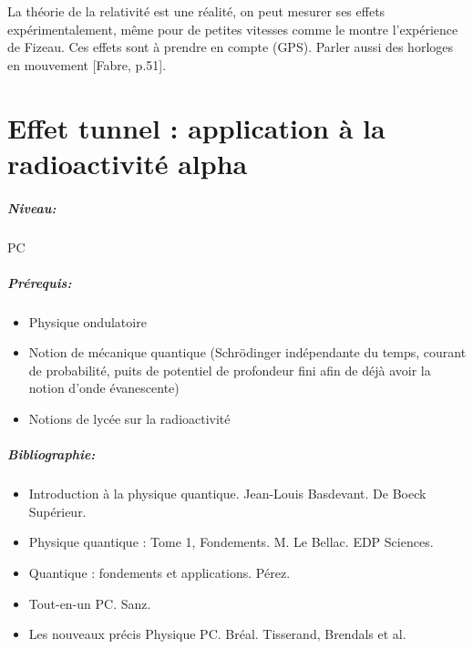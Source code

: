 \documentclass[11pt]{report}
\numberwithin{figure}{section}
\numberwithin{equation}{section}
\numberwithin{table}{section}
\newcommand{\1}{\boldsymbol{1}}
\begin{document}
La théorie de la relativité est une réalité, on peut mesurer ses effets expérimentalement, même pour de petites vitesses comme le montre l’expérience de Fizeau. Ces effets sont à prendre en compte (GPS). Parler aussi des horloges en mouvement [Fabre, p.51].

\newpage







\chapter{Effet tunnel : application à la radioactivité alpha}


\paragraph*{Niveau:} PC
\paragraph*{Prérequis:} 
\begin{itemize}
\item Physique ondulatoire
\item Notion de mécanique quantique (Schrödinger indépendante
du temps, courant de probabilité, puits
de potentiel de profondeur fini afin de déjà avoir la
notion d’onde évanescente)
\item Notions de lycée sur la radioactivité
\end{itemize}

\paragraph*{Bibliographie:}
\begin{itemize}
\item Introduction à la physique quantique. Jean-Louis Basdevant. De Boeck Supérieur.
\item Physique quantique : Tome 1, Fondements. M. Le Bellac. EDP Sciences.
\item Quantique : fondements et applications. Pérez.
\item Tout-en-un PC. Sanz.
\item Les nouveaux précis Physique PC. Bréal. Tisserand, Brendals et al.
\end{itemize}
\end{document}
